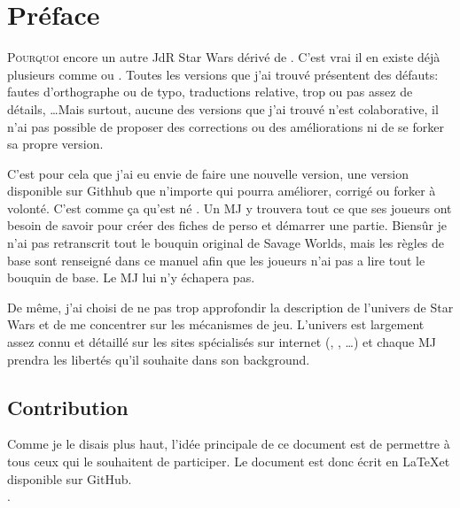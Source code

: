 \onecolumn
\section{Préface}

\lettrine{P}{ourquoi} encore un autre JdR {\jedifont Star Wars} dérivé de . C'est vrai il en existe déjà plusieurs comme  ou . Toutes les versions que j'ai trouvé présentent des défauts: fautes d'orthographe ou de typo, traductions relative, trop ou pas assez de détails, \ldots Mais surtout, aucune des versions que j'ai trouvé n'est colaborative, il n'ai pas possible de proposer des corrections ou des améliorations ni de se forker sa propre version.

C'est pour cela que j'ai eu envie de faire une nouvelle version, une version disponible sur Githhub que n'importe qui pourra améliorer, corrigé ou forker à volonté. C'est comme ça qu'est né {\jedifont \doctitle}. Un MJ y trouvera tout ce que ses joueurs ont besoin de savoir pour créer des fiches de perso et démarrer une partie. Biensûr je n'ai pas retranscrit tout le bouquin original de Savage Worlds, mais les règles de base sont renseigné dans ce manuel afin que les joueurs n'ai pas a lire tout le bouquin de base. Le MJ lui n'y échapera pas.

De même, j'ai choisi de ne pas trop approfondir la description de l'univers de Star Wars et de me concentrer sur les mécanismes de jeu. L'univers est largement assez connu et détaillé sur les sites spécialisés sur internet (, , \ldots) et chaque MJ prendra les libertés qu'il souhaite dans son background.

\subsection{Contribution}
Comme je le disais plus haut, l'idée principale de ce document est de permettre à tous ceux qui le souhaitent de participer. Le document est donc écrit en \LaTeX et disponible sur GitHub.\\
\cite{website:jdrp-starwars-reloaded}.

\twocolumn
